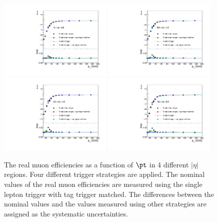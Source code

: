\begin{figure}[htbp]
\includegraphics[width=0.48\textwidth]{trigger_uncertainty_muon_eta060_ratio_plot.pdf}
\includegraphics[width=0.48\textwidth]{trigger_uncertainty_muon_eta60120_ratio_plot.pdf}\\
\includegraphics[width=0.48\textwidth]{trigger_uncertainty_muon_eta120180_ratio_plot.pdf}
\includegraphics[width=0.48\textwidth]{trigger_uncertainty_muon_eta180250_ratio_plot.pdf}
\caption{The real muon efficiencies as a function of $\pt$ in 4 different $|\eta|$ regions.
Four different trigger strategies are applied.
The nominal values of the real muon efficiencies are measured using the single lepton trigger with tag trigger matched.
The differences between the nominal values and the values measured using other strategies are assigned as the systematic uncertainties.}
\label{fig:RLE_trigger_bias_muon}
\end{figure}


